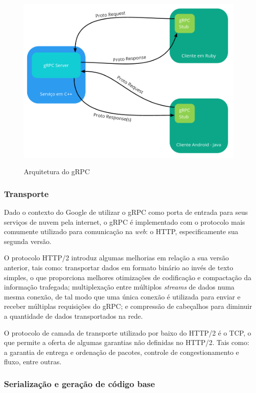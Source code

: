 \begin{figure}[ht]
    \centering
    \caption{Arquitetura do gRPC}
    \includegraphics[width=.7\textwidth]{figuras/diagramas/cap2/arquitetura_grpc.png} 
    \label{fig:arquitetura_grpc}
\end{figure}

\subsubsection{Transporte}

Dado o contexto do Google de utilizar o gRPC como porta de entrada para seus serviços de nuvem pela internet, o gRPC é implementado com o protocolo mais comumente utilizado para comunicação na \textit{web}: o HTTP, especificamente sua segunda versão.

O protocolo HTTP/2 introduz algumas melhorias em relação a sua versão anterior, tais como: transportar dados em formato binário ao invés de texto simples, o que proporciona melhores otimizações de codificação e compactação da informação trafegada; multiplexação entre múltiplos \textit{streams} de dados numa mesma conexão, de tal modo que uma única conexão é utilizada para enviar e receber múltiplas requisições do gRPC; e compressão de cabeçalhos para diminuir a quantidade de dados transportados na rede.

O protocolo de camada de transporte utilizado por baixo do HTTP/2 é o TCP, o que permite a oferta de algumas garantias não definidas no HTTP/2. Tais como: a garantia de entrega e ordenação de pacotes, controle de congestionamento e fluxo, entre outras.

\subsubsection{Serialização e geração de código base}

